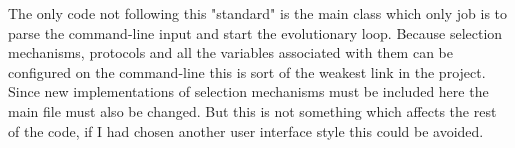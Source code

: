 The only code not following this "standard" is the main class which only job is
to parse the command-line input and start the evolutionary loop. Because
selection mechanisms, protocols and all the variables associated with them can
be configured on the command-line this is sort of the weakest link in the
project. Since new implementations of selection mechanisms must be included here
the main file must also be changed. But this is not something which affects the
rest of the code, if I had chosen another user interface style this could be
avoided.
